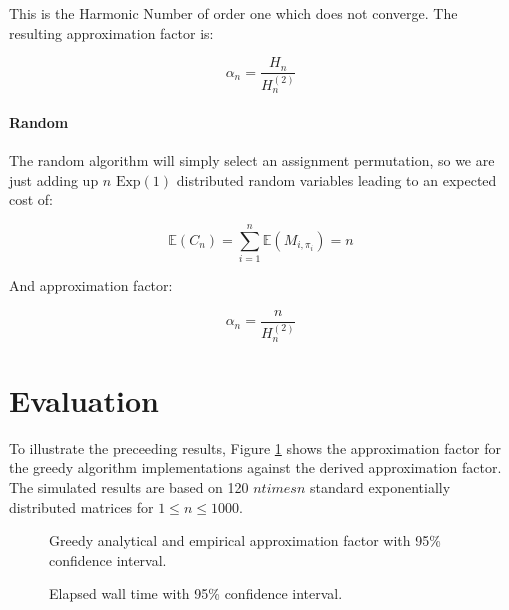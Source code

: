 \documentclass{article}
\newcommand{\expected}[1]{\mathbb{E} \left ( #1 \right )}
\newcommand{\exprv}[1]{\text{Exp} \left( #1 \right )}
\begin{document}
This is the Harmonic Number of order one which does not converge. The resulting approximation factor is:

\begin{equation}
	\alpha_n = \frac{H_n}{H_n^{(2)}}
\end{equation}

\paragraph{Random}

The random algorithm will simply select an assignment permutation, so we are just adding up $n$ $\exprv{1}$ distributed random variables leading to an expected cost of: 

\begin{equation}
	\expected{C_n} = \sum_{i=1}^n \expected{ M_{i, \pi_i} } = n
\end{equation}

And approximation factor:

\begin{equation}
	\alpha_n = \frac{n}{H_n^{(2)}}
\end{equation}

\section{Evaluation}

To illustrate the preceeding results, Figure \ref{fig:approximationFactor} shows the approximation factor for the greedy algorithm implementations against the derived approximation factor. The simulated results are based on 120 $n times n$ standard exponentially distributed matrices for $1 \le n \le 1000$. 

\begin{multicols}{2}
\begin{figure}[H]
	\centering
	\resizebox{\linewidth}{!}{}
	\caption{Greedy analytical and empirical approximation factor with 95\% confidence interval.}
	\label{fig:approximationFactor}
\end{figure}

\columnbreak

\begin{figure}[H]
	\centering
	\resizebox{\linewidth}{!}{}
	\caption{Elapsed wall time with 95\% confidence interval.}
	\label{fig:runtime}
\end{figure}
\end{multicols}
\end{document}
